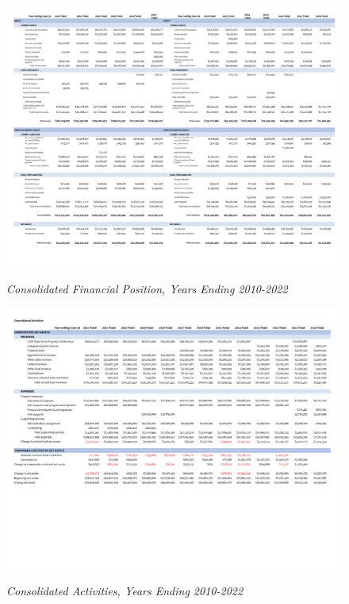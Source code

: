 \begin{figure}
  \caption[Consolidated Financial Position, Years Ending 2010–2022]{\textit{Consolidated Financial Position, Years Ending 2010-2022}}
 \label{fig:consolidated_financial_position_2010-2022} %
\includegraphics[width=\textheight]{Consolidated_Financial_Statements/Consolidated_Financial_Position_Years_2010-2022-2up.pdf}\\ %
\end{figure}

\begin{figure}
  \caption[Consolidated Activities, Years Ending 2010–2022]{\textit{Consolidated Activities, Years Ending 2010-2022}}\label{fig:consolidated_activities_2010-2022} %
  \includegraphics[width=\textheight]{Consolidated_Financial_Statements/Consolidated_Activities_Years_2010-2022-2up.pdf}\\ %
  \end{figure}



